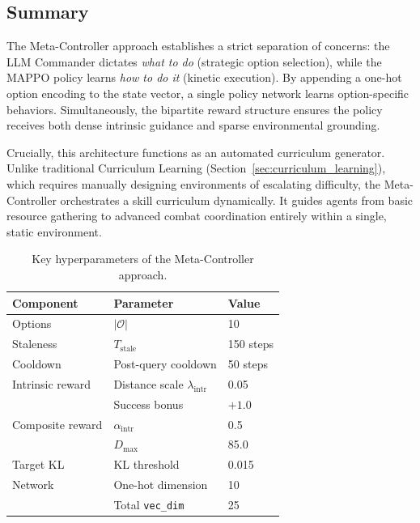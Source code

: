 \subsection{Summary}
\label{sec:hrl_summary}

The Meta-Controller approach establishes a strict separation of concerns: the LLM Commander dictates \emph{what to do} (strategic option selection), while the MAPPO policy learns \emph{how to do it} (kinetic execution). By appending a one-hot option encoding to the state vector, a single policy network learns option-specific behaviors. Simultaneously, the bipartite reward structure ensures the policy receives both dense intrinsic guidance and sparse environmental grounding.

Crucially, this architecture functions as an automated curriculum generator. Unlike traditional Curriculum Learning (Section~\ref{sec:curriculum_learning}), which requires manually designing environments of escalating difficulty, the Meta-Controller orchestrates a skill curriculum dynamically. It guides agents from basic resource gathering to advanced combat coordination entirely within a single, static environment.

\begin{table}[H]
\centering
\caption{Key hyperparameters of the Meta-Controller approach.}
\label{tab:hrl_hyperparams}
\begin{tabular}{@{}lll@{}}
\toprule
\textbf{Component} & \textbf{Parameter} & \textbf{Value} \\
\midrule
Options          & $|\mathcal{O}|$                & 10 \\
Staleness        & $T_{\text{stale}}$             & 150 steps \\
Cooldown         & Post-query cooldown            & 50 steps \\
Intrinsic reward & Distance scale $\lambda_{\text{intr}}$ & 0.05 \\
                 & Success bonus                  & $+1.0$ \\
Composite reward & $\alpha_{\text{intr}}$         & 0.5 \\
                 & $D_{\max}$                     & 85.0 \\
Target KL        & KL threshold                   & 0.015 \\
Network          & One-hot dimension              & 10 \\
                 & Total \texttt{vec\_dim}        & 25 \\
\bottomrule
\end{tabular}
\end{table}
